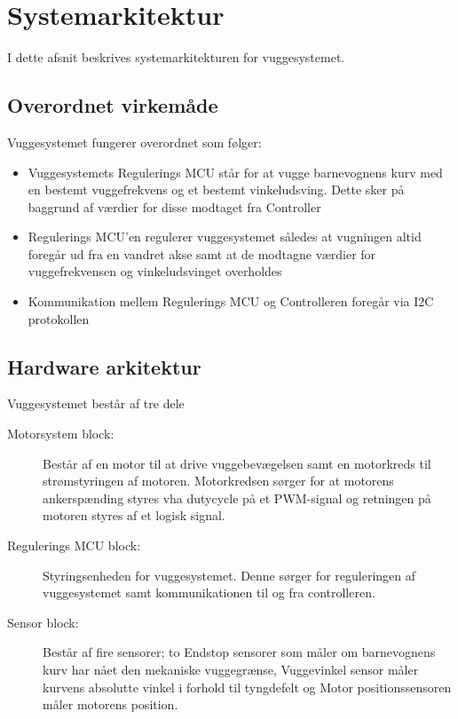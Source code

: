 \section{Systemarkitektur}

I dette afsnit beskrives systemarkitekturen for vuggesystemet.

\subsection*{Overordnet virkemåde}
Vuggesystemet fungerer overordnet som følger:
\begin{itemize}
	\item Vuggesystemets Regulerings MCU står for at vugge barnevognens kurv med en bestemt vuggefrekvens og et bestemt vinkeludsving. Dette sker på baggrund af værdier for disse modtaget fra Controller
	\item Regulerings MCU'en regulerer vuggesystemet således at vugningen altid foregår ud fra en vandret akse samt at de modtagne værdier for vuggefrekvensen og vinkeludsvinget overholdes  
	\item Kommunikation mellem Regulerings MCU og Controlleren foregår via I2C protokollen
\end{itemize}

\subsection{Hardware arkitektur}


Vuggesystemet består af tre dele
\begin{description}
\item[Motorsystem block:] Består af en motor til at drive vuggebevægelsen samt en motorkreds til strømstyringen af motoren. Motorkredsen sørger for at motorens ankerspænding styres vha dutycycle på et PWM-signal og retningen på motoren styres af et logisk signal.
\item[Regulerings MCU block:] Styringsenheden for vuggesystemet. Denne sørger for reguleringen af vuggesystemet samt kommunikationen til og fra controlleren.
\item[Sensor block:] Består af fire sensorer; to Endstop sensorer som måler om barnevognens kurv har nået den mekaniske vuggegrænse, Vuggevinkel sensor måler kurvens absolutte vinkel i forhold til tyngdefelt og Motor positionssensoren måler motorens position.
\end{description}

